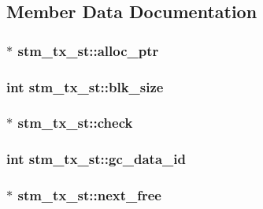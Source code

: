\subsection{Member Data Documentation}
\hypertarget{structstm__tx__st_a0a3260211b0c776d7d27671e42534e5b}{
\subsubsection[{alloc\-\_\-ptr}]{$\ast$ stm\-\_\-tx\-\_\-st\-::alloc\-\_\-ptr}}\label{structstm__tx__st_a0a3260211b0c776d7d27671e42534e5b}
\hypertarget{structstm__tx__st_ab1803cee4d1835e6faacd1305f2d1d05}{
\subsubsection[{blk\-\_\-size}]{\setlength{\rightskip}{0pt plus 5cm}int stm\-\_\-tx\-\_\-st\-::blk\-\_\-size}}\label{structstm__tx__st_ab1803cee4d1835e6faacd1305f2d1d05}
\hypertarget{structstm__tx__st_a990b6b92bfd85204ee8c519180187493}{
\subsubsection[{check}]{ $\ast$ stm\-\_\-tx\-\_\-st\-::check}}\label{structstm__tx__st_a990b6b92bfd85204ee8c519180187493}
\hypertarget{structstm__tx__st_ac61720100a57333033d7a51eb26808eb}{
\subsubsection[{gc\-\_\-data\-\_\-id}]{\setlength{\rightskip}{0pt plus 5cm}int stm\-\_\-tx\-\_\-st\-::gc\-\_\-data\-\_\-id}}\label{structstm__tx__st_ac61720100a57333033d7a51eb26808eb}
\hypertarget{structstm__tx__st_af8d4d49ab6f2e8c9d152974334c7960e}{
\subsubsection[{next\-\_\-free}]{$\ast$ stm\-\_\-tx\-\_\-st\-::next\-\_\-free}}\label{structstm__tx__st_af8d4d49ab6f2e8c9d152974334c7960e}
